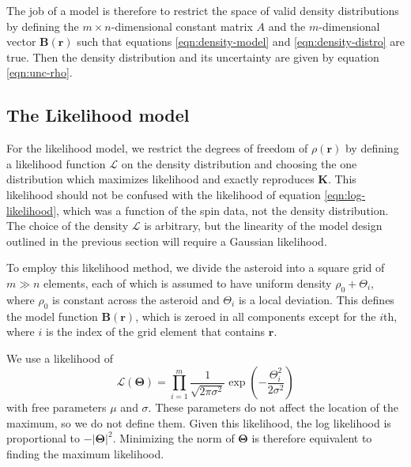 \documentclass[fleqn,usenatbib]{mnras}
\newcommand{\parens}[1]{\left( #1 \right)}
\begin{document}
The job of a model is therefore to restrict the space of valid density distributions by defining the $m\times n$-dimensional constant matrix $A$ and the $m$-dimensional vector $\bm B(\bm r)$ such that equations \ref{eqn:density-model} and \ref{eqn:density-distro} are true. Then the density distribution and its uncertainty are given by equation \ref{eqn:unc-rho}.



\subsection{The Likelihood model}
\label{sec:likelihood}

For the likelihood model, we restrict the degrees of freedom of $\rho(\bm r)$ by defining a likelihood function $\mathcal{L}$ on the density distribution and choosing the one distribution which maximizes likelihood and exactly reproduces $\bm K$. This likelihood should not be confused with the likelihood of equation \ref{eqn:log-likelihood}, which was a function of the spin data, not the density distribution. The choice of the density $\mathcal{L}$ is arbitrary, but the linearity of the model design outlined in the previous section will require a Gaussian likelihood.

To employ this likelihood method, we divide the asteroid into a square grid of $m \gg n$ elements, each of which is assumed to have uniform density $\rho_0+\Theta_i$, where $\rho_0$ is constant across the asteroid and $\Theta_i$ is a local deviation. This defines the model function $\bm B(\bm r)$, which is zeroed in all components except for the $i$th, where $i$ is the index of the grid element that contains $\bm r$.

We use a likelihood of 
\begin{equation}
  \mathcal{L}(\bm \Theta) = \prod_{i=1}^m \frac{1}{\sqrt{2\pi \sigma^2}} \exp\parens{-\frac{\Theta_i^2}{2 \sigma^2}}
\end{equation}
with free parameters $\mu$ and $\sigma$. These parameters do not affect the location of the maximum, so we do not define them. Given this likelihood, the log likelihood is proportional to $-|\bm \Theta|^2$. Minimizing the norm of $\bm \Theta$ is therefore equivalent to finding the maximum likelihood.
\end{document}
